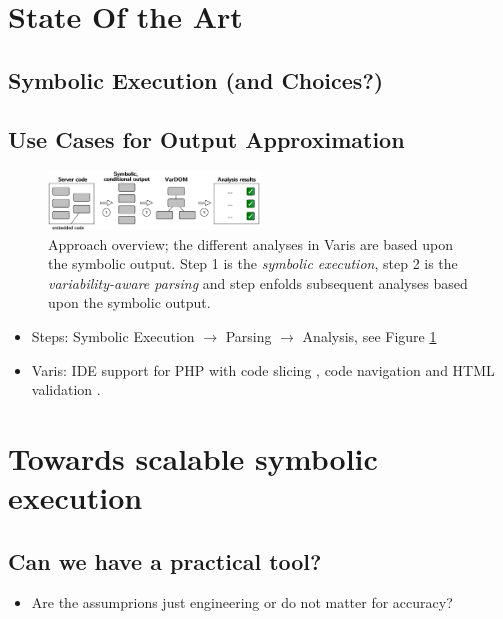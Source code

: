 \documentclass{sig-alternate-05-2015}
\begin{document}
\section{State Of the Art}
\subsection{Symbolic Execution (and Choices?)}
\subsection{Use Cases for Output Approximation}

\begin{figure}
	
	\centering
	\includegraphics[width=0.5\textwidth]{images-paper/approach}
	\caption{Approach overview; the different analyses in Varis are based upon the
	symbolic output. Step 1 is the \emph{symbolic execution}, step 2 is the
	\emph{variability-aware parsing} and step enfolds subsequent analyses based
	upon the symbolic output.}
	\label{approach}
\end{figure}

\begin{itemize}
  \item Steps: Symbolic Execution $\rightarrow$ Parsing $\rightarrow$
  Analysis, see Figure \ref{approach}
  \item Varis: IDE support \cite{Nguyen:2015:VIS:2819009.2819140} for PHP with
  code slicing \cite{Nguyen:2015:CPS:2786805.2786872}, code navigation
  \cite{Nguyen:2014:BCG:2635868.2635928} and
  HTML validation \cite{Nguyen:2011:AFH:2190078.2190142}.
\end{itemize}

\section{Towards scalable symbolic execution}
\subsection{Can we have a practical tool?}
\begin{itemize}
  \item Are the assumprions just engineering or do not matter for accuracy? 
\end{itemize}
\end{document}
